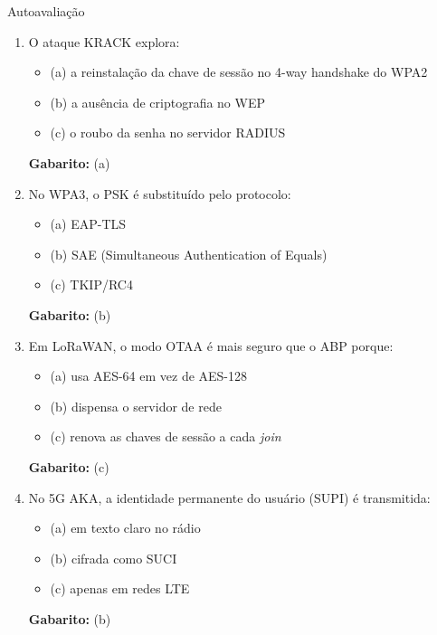 \documentclass[aspectratio=169,11pt]{beamer}
\begin{document}
\begin{frame}{Autoavaliação}
  \begin{enumerate}
    \item O ataque KRACK explora:
      \begin{itemize}
        \item (a) a reinstalação da chave de sessão no 4-way handshake do WPA2
        \item (b) a ausência de criptografia no WEP
        \item (c) o roubo da senha no servidor RADIUS
      \end{itemize}
      \pause
      \textbf{Gabarito:} (a)

    \item No WPA3, o PSK é substituído pelo protocolo:
      \begin{itemize}
        \item (a) EAP-TLS
        \item (b) SAE (Simultaneous Authentication of Equals)
        \item (c) TKIP/RC4
      \end{itemize}
      \pause
      \textbf{Gabarito:} (b)

    \item Em LoRaWAN, o modo OTAA é mais seguro que o ABP porque:
      \begin{itemize}
        \item (a) usa AES-64 em vez de AES-128
        \item (b) dispensa o servidor de rede
        \item (c) renova as chaves de sessão a cada \emph{join}
      \end{itemize}
      \pause
      \textbf{Gabarito:} (c)

    \item No 5G AKA, a identidade permanente do usuário (SUPI) é transmitida:
      \begin{itemize}
        \item (a) em texto claro no rádio
        \item (b) cifrada como SUCI
        \item (c) apenas em redes LTE
      \end{itemize}
      \pause
      \textbf{Gabarito:} (b)
  \end{enumerate}
\end{frame}
\end{document}

